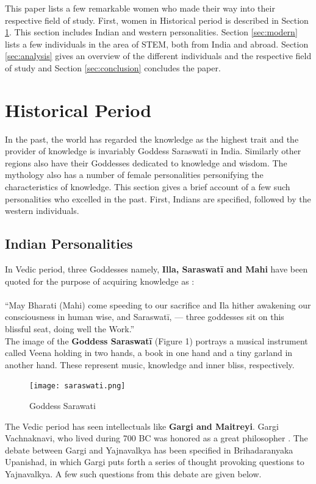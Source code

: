 \documentclass[a4paper,10pt]{article}
\begin{document}
This paper lists a few remarkable women who made their way into their respective field of study. First, women in Historical period is described in Section \ref{sec:History}. This section includes Indian and western personalities. Section \ref{sec:modern} lists a few individuals in the area of STEM, both from India and abroad. Section \ref{sec:analysis} gives an overview of the different individuals and the respective field of study and Section \ref{sec:conclusion} concludes the paper. 

\section{Historical Period}
\label{sec:History}
In the past, the world has regarded the knowledge as the highest trait and the provider of knowledge is invariably Goddess Saraswat\={i} in India. Similarly other regions also have their Goddesses dedicated to knowledge and wisdom. The mythology also has a number of female personalities personifying the characteristics of knowledge. This section gives a brief account of a few such personalities who excelled in the past. First, Indians are specified, followed by the western individuals. 

\subsection{Indian Personalities}
In Vedic period, three Goddesses namely, \textbf{Illa, Saraswat\={i} and Mahi} have been quoted for the purpose of acquiring knowledge as \cite{saras}: \\
\\
“May Bharati (Mahi) come speeding to our sacrifice and Ila hither awakening our consciousness in human wise, and Saraswat\={i}, — three goddesses sit on this blissful seat, doing well the Work.” \\

The image of the \textbf{Goddess Saraswat\={i}} (Figure 1) portrays a musical instrument called Veena holding in  two hands, a book in one hand and a tiny garland in another hand. These represent music, knowledge and inner bliss, respectively.

\begin{center}
\begin{figure}[h]
\centering
 \texttt{[image: saraswati.png]}
 \caption{Goddess Sarawati}
\end{figure}
\end{center}
\newblock
The Vedic period has seen intellectuals like \textbf{Gargi and Maitreyi}. Gargi Vachnaknavi, who lived during 700 BC was honored as a great philosopher \cite{Gargi}. The debate between Gargi and Yajnavalkya has been specified in Brihadaranyaka Upanishad, in which Gargi puts forth a series of thought provoking questions to Yajnavalkya. A few such questions from this debate are given below. \\
\end{document}
